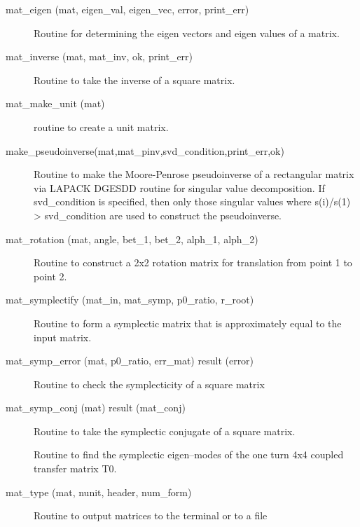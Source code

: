 \begin{description}

\label{r:mat.eigen}
\item[mat_eigen (mat, eigen_val, eigen_vec, error, print_err)] \Newline 
Routine for determining the eigen vectors and eigen values of a matrix.

\label{r:mat.inverse}
\item[mat_inverse (mat, mat_inv, ok, print_err)] \Newline
Routine to take the inverse of a square matrix. 

\label{r:mat.make.unit}
\item[mat_make_unit (mat)] \Newline 
     routine to create a unit matrix.

\label{r:mat.make.pseudoinverse}
\item[make_pseudoinverse(mat,mat_pinv,svd_condition,print_err,ok)]
Routine to make the Moore-Penrose pseudoinverse of a rectangular matrix via
LAPACK DGESDD routine for singular value decomposition.  If svd_condition
is specified, then only those singular values where
s(i)/s(1) > svd_condition are used to construct the pseudoinverse.

\label{r:mat.rotation}
\item[mat_rotation (mat, angle, bet_1, bet_2, alph_1, alph_2)] \Newline 
     Routine to construct a 2x2 rotation matrix for translation from
     point 1 to point 2.

\label{r:mat.symplectify}
\item[mat_symplectify (mat_in, mat_symp, p0_ratio, r_root)] \Newline
Routine to form a symplectic matrix that is approximately equal to the input matrix. 

\label{r:mat.symp.error}
\item[mat_symp_error (mat, p0_ratio, err_mat) result (error)] \Newline
Routine to check the symplecticity of a square matrix 

\label{r:mat.symp.conj}
\item[mat_symp_conj (mat) result (mat_conj)] \Newline 
Routine to take the symplectic conjugate of a square matrix.

\label{r:mat.symp.decouple}
\item[\protect\parbox{6in}{
    mat_symp_decouple (t0, stat, u, v, \\
    \hspace*{1in} ubar, vbar, g, twiss1, twiss2, gamma, type_out)} ] \Newline
Routine to find the symplectic eigen--modes of the one turn 4x4 coupled 
transfer matrix T0. 

\label{r:mat.type}
\item[mat_type (mat, nunit, header, num_form)] \Newline 
     Routine to output matrices to the terminal or to a file

\end{description}

